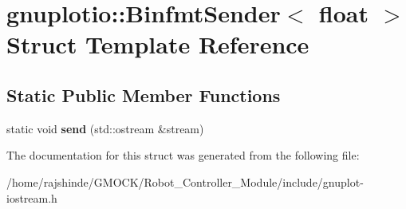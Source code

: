 \hypertarget{structgnuplotio_1_1_binfmt_sender_3_01float_01_4}{}\section{gnuplotio\+:\+:Binfmt\+Sender$<$ float $>$ Struct Template Reference}
\label{structgnuplotio_1_1_binfmt_sender_3_01float_01_4}
\subsection*{Static Public Member Functions}
\begin{DoxyCompactItemize}
\item 
static void {\bfseries send} (std\+::ostream \&stream)\hypertarget{structgnuplotio_1_1_binfmt_sender_3_01float_01_4_ae9c6a1915ee24e54ea5ed1a22c54fee1}{}\label{structgnuplotio_1_1_binfmt_sender_3_01float_01_4_ae9c6a1915ee24e54ea5ed1a22c54fee1}

\end{DoxyCompactItemize}


The documentation for this struct was generated from the following file\+:\begin{DoxyCompactItemize}
\item 
/home/rajshinde/\+G\+M\+O\+C\+K/\+Robot\+\_\+\+Controller\+\_\+\+Module/include/gnuplot-\/iostream.\+h\end{DoxyCompactItemize}
